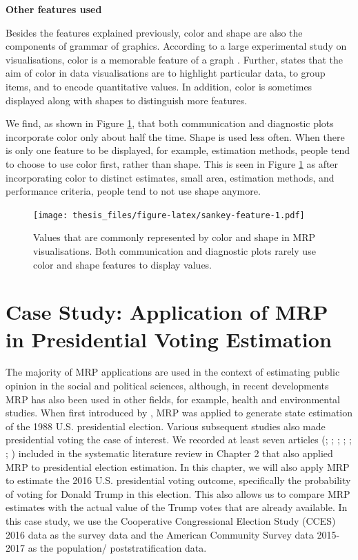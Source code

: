 \documentclass{monashthesis}
\begin{document}
\textbf{Other features used}

Besides the features explained previously, color and shape are also the components of grammar of graphics. According to a large experimental study on visualisations, color is a memorable feature of a graph \autocite{MIDWAY2020100141}. Further, \textcite{few_2008} states that the aim of color in data visualisations are to highlight particular data, to group items, and to encode quantitative values. In addition, color is sometimes displayed along with shapes to distinguish more features.

We find, as shown in Figure \ref{fig:sankey-feature}, that both communication and diagnostic plots incorporate color only about half the time. Shape is used less often. When there is only one feature to be displayed, for example, estimation methods, people tend to choose to use color first, rather than shape. This is seen in Figure \ref{fig:sankey-feature} as after incorporating color to distinct estimates, small area, estimation methods, and performance criteria, people tend to not use shape anymore.

\begin{figure}
\centering
\texttt{[image: thesis\_files/figure-latex/sankey-feature-1.pdf]}
\caption{\label{fig:sankey-feature}Values that are commonly represented by color and shape in MRP visualisations. Both communication and diagnostic plots rarely use color and shape features to display values.}
\end{figure}

\hypertarget{ch:case-stud}{%
\chapter{Case Study: Application of MRP in Presidential Voting Estimation}\label{ch:case-stud}}

The majority of MRP applications are used in the context of estimating public opinion in the social and political sciences, although, in recent developments MRP has also been used in other fields, for example, health and environmental studies. When first introduced by \textcite{Gelman97poststratificationinto}, MRP was applied to generate state estimation of the 1988 U.S. presidential election. Various subsequent studies also made presidential voting the case of interest. We recorded at least seven articles (\textcite{GelmanAndrew2014HBAC}; \textcite{GhitzaYair2013DIwM}; \textcite{KiewietdeJongeChadP2018PSPE}; \textcite{LauderdaleBenjaminE2020Mppf}; \textcite{LeiRayleigh2017T2EA}; \textcite{ParkDavidK2004BMEw}; \textcite{WangWei2015Fewn}) included in the systematic literature review in Chapter 2 that also applied MRP to presidential election estimation. In this chapter, we will also apply MRP to estimate the 2016 U.S. presidential voting outcome, specifically the probability of voting for Donald Trump in this election. This also allows us to compare MRP estimates with the actual value of the Trump votes that are already available. In this case study, we use the Cooperative Congressional Election Study (CCES) 2016 data \autocite{cces_data} as the survey data and the American Community Survey data 2015-2017 \autocite{acs_data} as the population/ poststratification data.
\end{document}
